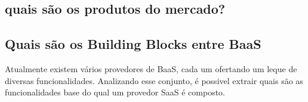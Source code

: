 
	\subsection{quais são os produtos do mercado?}

	\subsection{Quais são os Building Blocks entre BaaS}
	Atualmente existem vários provedores de BaaS, \cite{subsection_acima} cada um ofertando um leque de diversas funcionalidades. Analizando esse conjunto, é possivel extrair quais são as funcionalidades base do qual um provedor SaaS é composto.

